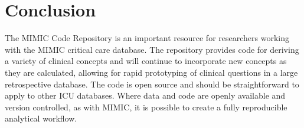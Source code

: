 \documentclass{bioinfo}
\begin{document}






\section{Conclusion}

The MIMIC Code Repository is an important resource for researchers working with the MIMIC critical care database. The repository provides code for deriving a variety of clinical concepts and will continue to incorporate new concepts as they are calculated, allowing for rapid prototyping of clinical questions in a large retrospective database. The code is open source and should be straightforward to apply to other ICU databases. Where data and code are openly available and version controlled, as with MIMIC, it is possible to create a fully reproducible analytical workflow.
\end{document}
